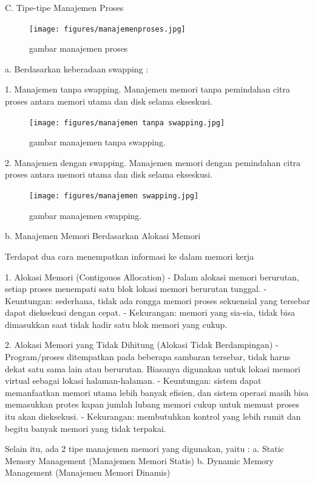 C. Tipe-tipe Manajemen Proses

\begin{figure}[ht]
\centerline{\texttt{[image: figures/manajemenproses.jpg]}}
\caption{gambar manajemen proses}
\label{manajemen proses}
\end{figure}

a. Berdasarkan keberadaan swapping :

	1. Manajemen tanpa swapping.
		Manajemen memori tanpa pemindahan citra proses antara memori utama dan disk selama ekseskusi.
	
		\begin{figure}[ht]
		\centerline{\texttt{[image: figures/manajemen tanpa swapping.jpg]}}
		\caption{gambar manajemen tanpa swapping.}
		\label{manajemen tanpa swapping}
		\end{figure}


	2. Manajemen dengan swapping.
		Manajemen memori dengan pemindahan citra proses antara memori utama dan disk selama ekseskusi.

		\begin{figure}[ht]
		\centerline{\texttt{[image: figures/manajemen swapping.jpg]}}
		\caption{gambar manajemen swapping.}
		\label{manajemen swapping}
		\end{figure}


b. Manajemen Memori Berdasarkan Alokasi Memori

Terdapat dua cara menempatkan informasi ke dalam memori kerja

	1. Alokasi Memori (Contigouos Allocation)
		- Dalam alokasi memori berurutan, setiap proses menempati satu blok lokasi memori berurutan tunggal.
		- Keuntungan: sederhana, tidak ada rongga memori proses sekuensial yang tersebar dapat dieksekusi dengan cepat.
		- Kekurangan: memori yang sia-sia, tidak bisa dimasukkan saat tidak hadir satu blok memori yang cukup.

	2. Alokasi Memori yang Tidak Dihitung (Alokasi Tidak Berdampingan)
		- Program/proses ditempatkan pada beberapa sambaran tersebar, tidak harus dekat satu sama lain atau berurutan. Biasanya digunakan untuk lokasi memori virtual sebagai lokasi halaman-halaman.
		- Keuntungan: sistem dapat memanfaatkan memori utama lebih banyak efisien, dan sistem operasi masih bisa memasukkan protes kapan jumlah lubang memori cukup untuk memuat proses itu akan dieksekusi.
		- Kekurangan: membutuhkan kontrol yang lebih rumit dan begitu banyak memori yang tidak terpakai.

	Selain itu, ada 2 tipe manajemen memori yang digunakan, yaitu :
	a. Static Memory Management (Manajemen Memori Statis)
	b. Dynamic Memory Management (Manajemen Memori Dinamis)

